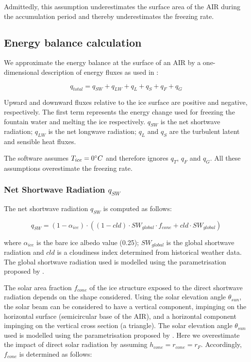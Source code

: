 \documentclass[utf8]{frontiersSCNS}
\begin{document}
Admittedly, this assumption underestimates the surface area of the AIR during the accumulation period and
thereby underestimates the freezing rate.

\subsection{Energy balance calculation} \label{sec:energy}

We approximate the energy balance at the surface of an AIR by a one-dimensional description of energy fluxes as
used in \cite{Balasubramanian_2022}:

\begin{equation}
	 q_{total} = q_{SW} + q_{LW} + q_{L} + q_{S} + q_{F} + q_{G}
	\label{eqn:EB}
\end{equation}

Upward and downward fluxes relative to the ice surface are positive and negative, respectively. The first
term represents the energy change used for freezing the fountain water and melting the ice respectively.
$q_{SW}$ is the net shortwave radiation; $q_{LW}$ is the net longwave radiation; $q_{L}$ and $q_{S}$ are the
turbulent latent and sensible heat fluxes. 

The software assumes $T_{ice} = 0 \degree C$ and therefore ignores $q_{T}$, $q_{F}$ and $q_{G}$. All these
assumptions overestimate the freezing rate.

\subsubsection{Net Shortwave Radiation \texorpdfstring{$q_{SW}$}{Lg}} \label{sec:SW}

The net shortwave radiation $q_{SW}$ is computed as follows:

\begin{equation} q_{SW} = (1- \alpha_{ice}) \cdot ( (1- cld) \cdot SW_{global} \cdot f_{cone} + cld \cdot SW_{global}) \label{eqn:SW} \end{equation}

where $\alpha_{ice}$ is the bare ice albedo value (0.25); $SW_{global}$ is the global shortwave radiation and
$cld$ is a cloudiness index determined from historical weather data. The global shortwave radiation used is modelled using the parametrisation proposed by \cite{Woolf_1968}.

The solar area fraction $f_{cone}$ of the ice structure exposed to the direct shortwave radiation depends on the
shape considered. Using the solar elevation angle $\theta_{sun}$, the solar beam can be considered to have a
vertical component, impinging on the horizontal surface (semicircular base of the AIR), and a horizontal
component impinging on the vertical cross section (a triangle). The solar elevation angle $\theta_{sun}$ used is
modelled using the parametrisation proposed by \cite{Woolf_1968}. Here we overestimate the impact of direct
solar radiation by assuming $h_{cone} = r_{cone} = r_{F}$. Accordingly, $f_{cone}$ is determined as
follows:
\end{document}
